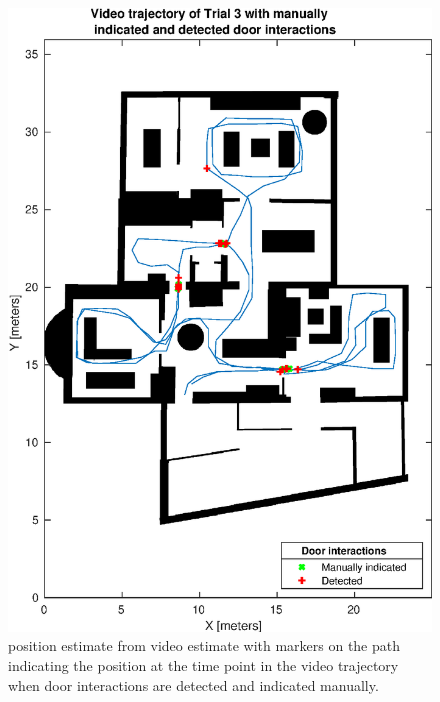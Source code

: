 \begin{figure}[H]
	\centering
	\includegraphics[width=0.7\linewidth]{images/20201129_2330_video_traj_Trial_3_door_detect_vs_manual_1}
	\setlength{\belowcaptionskip}{-10pt}
	\caption{position estimate from video estimate with markers on the path indicating the position at the time point in the video trajectory when door interactions are detected and indicated manually.}
	\label{fig:video_traj_trial3_door_detect_vs_manual_1}
\end{figure}
 
 
 
 